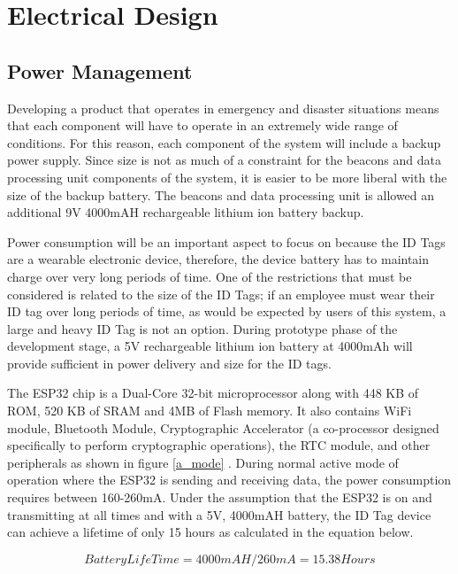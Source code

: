 

\setcounter{section}{4}
\section{Electrical Design}
\bigskip

\subsection{Power Management}
\medskip

Developing a product that operates in emergency and disaster situations means that each component will have to operate in an extremely wide range of conditions. For this reason, each component of the system will include a backup power supply. Since size is not as much of a constraint for the beacons and data processing unit components of the system, it is easier to be more liberal with the size of the backup battery. The beacons and data processing unit is allowed an additional 9V 4000mAH rechargeable lithium ion battery backup. 

\bigskip
Power consumption will be an important aspect to focus on because the ID Tags are a wearable electronic device, therefore, the device battery has to maintain charge over very long periods of time. One of the restrictions that must be considered is related to the size of the ID Tags; if an employee must wear their ID tag over long periods of time, as would be expected by users of this system, a large and heavy ID Tag is not an option. During prototype phase of the development stage, a 5V rechargeable lithium ion battery at 4000mAh will provide sufficient in power delivery and size for the ID tags. 

\bigskip
The ESP32 chip is a Dual-Core 32-bit microprocessor along with 448 KB of ROM, 520 KB of SRAM and 4MB of Flash memory. It also contains WiFi module, Bluetooth Module, Cryptographic Accelerator (a co-processor designed specifically to perform cryptographic operations), the RTC module, and other peripherals as shown in figure \ref{a_mode} \cite{R5-1-1}. During normal active mode of operation where the ESP32 is sending and receiving data, the power consumption requires between 160-260mA. Under the assumption that the ESP32 is on and transmitting at all times and with a 5V, 4000mAH battery, the ID Tag device can achieve a lifetime of only 15 hours as calculated in the equation below.

\medskip
\begin{equation}
Battery Life Time = 4000mAH/260mA = 15.38 Hours
\end{equation}

